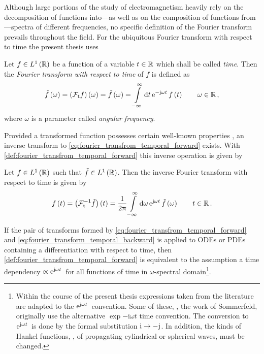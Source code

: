 Although large portions of the study of electromagnetism heavily rely on the
decomposition of functions into---as well as on the composition of functions
from---spectra of different frequencies, no specific definition of the Fourier
transform prevails throughout the field.
For the ubiquitous Fourier transform with respect to time the present thesis
uses
\begin{definition}
	\label{def:fourier_transfrom_temporal_forward}
	Let $f \in L^1\left( \mathbb{R} \right)$ be a function of a variable $t \in \mathbb{R}$
	which shall be called \emph{time}.
	Then the \emph{Fourier transform with respect to time} of $f$ is defined as 
	\begin{equation}\label{eq:fourier_transfrom_temporal_forward}
		\tilde{f} \left(\omega\right) = 
		\left( \mathcal{F}_{\mathrm{t}} f \right) \left(\omega\right) = 
		\tilde{f} \left( \omega \right) =
		\int\limits_{-\infty}^{\infty} \mathrm{d} t \,
		\mathrm{e}^{-\mathrm{j} \omega t}\, 
		f\left( t \right)
		\qquad \omega \in \mathbb{R}
		\, ,
	\end{equation}
	where $\omega$ is a parameter called \emph{angular frequency}.
\end{definition}
Provided a transformed function possesses certain well-known properties
\cite{heuser2006, strichartz2003}, an inverse transform to
\eqref{eq:fourier_transfrom_temporal_forward} exists.
With \cref{def:fourier_transfrom_temporal_forward}  this inverse operation is
given by
\begin{lemma}
	Let $f \in L^1 \left(\mathbb{R}\right)$ such that
	$\tilde{f} \in L^1 \left(\mathbb{R}\right)$. Then the
	inverse Fourier transform with respect to time is given by
	\begin{equation}\label{eq:fourier_transform_temporal_backward}
		f \left(t\right) =
		\left( \mathcal{F}_{\mathrm{t}}^{-1} \tilde{f} \right)
		\left( t \right) = 
		\frac{1}{2\uppi}
		\int\limits_{-\infty}^{\infty} \mathrm{d} \omega \,
		\mathrm{e}^{\mathrm{j} \omega t}\, 
		\tilde{f} \left( \omega \right)
		\qquad t \in \mathbb{R}
		\, .
	\end{equation}
\end{lemma}

\begin{remark}\label{rem:time_convention}
	If the pair of transforms formed by
	\eqref{eq:fourier_transfrom_temporal_forward} and
	\eqref{eq:fourier_transform_temporal_backward} is applied to \acp{ODE}
	or \acp{PDE} containing a differentiation with respect to time, then
	\cref{def:fourier_transfrom_temporal_forward} is equivalent to the
	assumption a time dependency $\propto\mathrm{e}^{\mathrm{j} \omega t}\,$ for all
	functions of time in $\omega$-spectral domain\footnote{Within the course of
	the present thesis expressions taken from the literature are adapted to the
	$\mathrm{e}^{\mathrm{j} \omega t}\,$ convention. Some of these, \eg, the work of
	Sommerfeld, originally use the alternative $\exp{-\mathrm{i} \omega t}$
	time convention.
	The conversion to $\mathrm{e}^{\mathrm{j} \omega t}\,$ is done by the formal substitution
	$\mathrm{i} \to -\mathrm{j}$. In addition, the kinds of Hankel functions, \ie,
	of propagating cylindrical or spherical waves, must be changed.}.
\end{remark}

